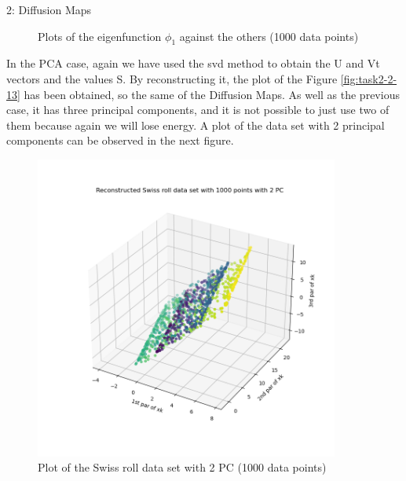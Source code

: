 \documentclass[10pt,a4paper]{article}
\begin{document}
\begin{task}{2: Diffusion Maps}
\begin{figure} [H]
\centering
    \caption{Plots of the eigenfunction \(\phi_1\) against the others (1000 data points)}
    \label{plots}
\end{figure}

In the PCA case, again we have used the svd method to obtain the U and Vt vectors and the values S. By reconstructing it, the plot of the Figure \ref{fig:task2-2-13} has been obtained, so the same of the Diffusion Maps. As well as the previous case, it has three principal components, and it is not possible to just use two of them because again we will lose energy. A plot of the data set with 2 principal components can be observed in the next figure.

\begin{figure} [H]
    \centering
    \includegraphics[width=10cm]{images/Swiss_plot_2_PC_1000.png}
    \caption{Plot of the Swiss roll data set with 2 PC (1000 data points)}
    \label{fig:task2-2-24}
\end{figure}

\bigskip



\end{task}
\end{document}
